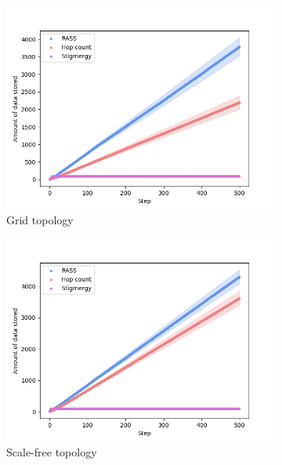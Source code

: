 \begin{figure}
    \centering
    \begin{subfigure}{0.45\textwidth}
        \includegraphics[width=\textwidth]{figures/dora_mesh/grid_storage.png}
        \caption{Grid topology}
        \label{results:grid_100_storage}
    \end{subfigure}
    \begin{subfigure}{0.45\textwidth}
        \includegraphics[width=\textwidth]{figures/dora_mesh/scale_storage.png}
        \caption{Scale-free topology}
        \label{results:scale_100_storage}
    \end{subfigure}
    \begin{subfigure}{0.45\textwidth}

\end{subfigure}
\end{figure}

